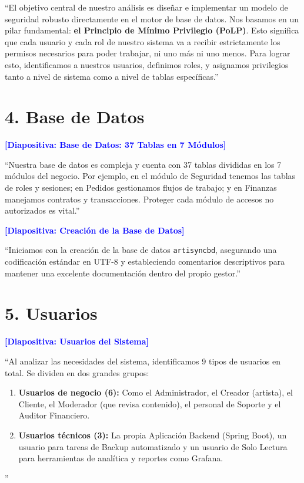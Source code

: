 \documentclass[12pt, a4paper]{article}
\begin{document}
``El objetivo central de nuestro análisis es diseñar e implementar un modelo de seguridad robusto directamente en el motor de base de datos. 
Nos basamos en un pilar fundamental: \textbf{el Principio de Mínimo Privilegio (PoLP)}. Esto significa que cada usuario y cada rol de nuestro sistema va a recibir estrictamente los permisos necesarios para poder trabajar, ni uno más ni uno menos. Para lograr esto, identificamos a nuestros usuarios, definimos roles, y asignamos privilegios tanto a nivel de sistema como a nivel de tablas específicas.''

\section*{4. Base de Datos}
\textbf{\textcolor{blue}{[Diapositiva: Base de Datos: 37 Tablas en 7 Módulos]}}

``Nuestra base de datos es compleja y cuenta con 37 tablas divididas en los 7 módulos del negocio. Por ejemplo, en el módulo de Seguridad tenemos las tablas de roles y sesiones; en Pedidos gestionamos flujos de trabajo; y en Finanzas manejamos contratos y transacciones. Proteger cada módulo de accesos no autorizados es vital.''

\vspace{0.5cm}
\textbf{\textcolor{blue}{[Diapositiva: Creación de la Base de Datos]}}

``Iniciamos con la creación de la base de datos \texttt{artisyncbd}, asegurando una codificación estándar en UTF-8 y estableciendo comentarios descriptivos para mantener una excelente documentación dentro del propio gestor.''

\section*{5. Usuarios}
\textbf{\textcolor{blue}{[Diapositiva: Usuarios del Sistema]}}

``Al analizar las necesidades del sistema, identificamos 9 tipos de usuarios en total. Se dividen en dos grandes grupos:
\begin{enumerate}
    \item \textbf{Usuarios de negocio (6):} Como el Administrador, el Creador (artista), el Cliente, el Moderador (que revisa contenido), el personal de Soporte y el Auditor Financiero.
    \item \textbf{Usuarios técnicos (3):} La propia Aplicación Backend (Spring Boot), un usuario para tareas de Backup automatizado y un usuario de Solo Lectura para herramientas de analítica y reportes como Grafana.
\end{enumerate}''
\end{document}
